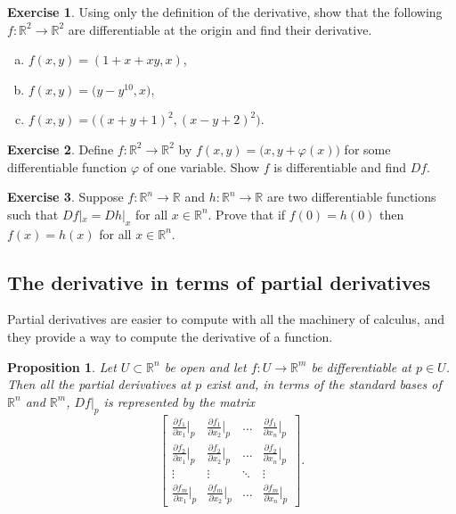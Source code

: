 \documentclass[12pt,openany]{book}
\newcommand{\R}{{\mathbb{R}}}
\theoremstyle{plain}
\newtheorem{prop}[thm]{Proposition}
\theoremstyle{remark}
\theoremstyle{definition}
\newenvironment{exbox}{%
    \def\FrameCommand{\vrule width 1pt \relax\hspace {10pt}}%
    \MakeFramed {\advance \hsize -\width \FrameRestore }%
}{%
    \endMakeFramed
}
\newenvironment{exparts}{%
    \leavevmode\begin{enumerate}[a),noitemsep,topsep=0pt,parsep=0pt,partopsep=0pt]
}{%
    \end{enumerate}
}
\theoremstyle{exercise}
\newtheorem{exercise}{Exercise}[section]
\theoremstyle{example}
\begin{document}
\begin{exbox}
\begin{samepage}
\begin{exercise}
Using only the definition of the derivative, show that
the following $f \colon \R^2 \to \R^2$ are differentiable at the origin and
find their derivative.
\begin{exparts}
\item
$f(x,y) = (1+x+xy,x)$,
\item
$f(x,y) = \bigl(y-y^{10},x \bigr)$,
\item
$f(x,y) = \bigl( {(x+y+1)}^2 , {(x-y+2)}^2 \bigr)$.
\end{exparts}
\end{exercise}
\end{samepage}

\begin{exercise}
Define $f \colon \R^2 \to \R^2$ by $f(x,y) =
\bigl(x,y+\varphi(x)\bigr)$ for some differentiable function $\varphi$ of one
variable.  Show $f$ is differentiable and find $Df$.
\end{exercise}

\begin{exercise}
Suppose $f \colon \R^n \to \R$ and $h \colon \R^n \to \R$ are two 
differentiable functions such that $Df|_x = Dh|_x$ for all $x \in \R^n$.
Prove that
if $f(0) = h(0)$ then $f(x) = h(x)$ for all $x \in \R^n$.
\end{exercise}
\end{exbox}


\subsection{The derivative in terms of partial derivatives}

Partial derivatives are easier to compute with all the machinery of
calculus, and they provide a way to compute the derivative of a
function.

\begin{prop} \label{mv:prop:jacobianmatrix}
Let $U \subset \R^n$ be open and let $f \colon U \to \R^m$ be
differentiable at $p \in U$.  Then all the partial derivatives at $p$
exist and, in terms of the standard bases of $\R^n$ and $\R^m$,
$Df|_p$ is represented by the matrix
\begin{equation*}
\begin{bmatrix}
\frac{\partial f_1}{\partial x_1}\big|_p
&
\frac{\partial f_1}{\partial x_2}\big|_p
& \ldots &
\frac{\partial f_1}{\partial x_n}\big|_p
\\[6pt]
\frac{\partial f_2}{\partial x_1}\big|_p
&
\frac{\partial f_2}{\partial x_2}\big|_p
& \ldots &
\frac{\partial f_2}{\partial x_n}\big|_p
\\
\vdots & \vdots & \ddots & \vdots
\\
\frac{\partial f_m}{\partial x_1}\big|_p
&
\frac{\partial f_m}{\partial x_2}\big|_p
& \ldots &
\frac{\partial f_m}{\partial x_n}\big|_p
\end{bmatrix} .
\end{equation*}
\end{prop}
\end{document}
